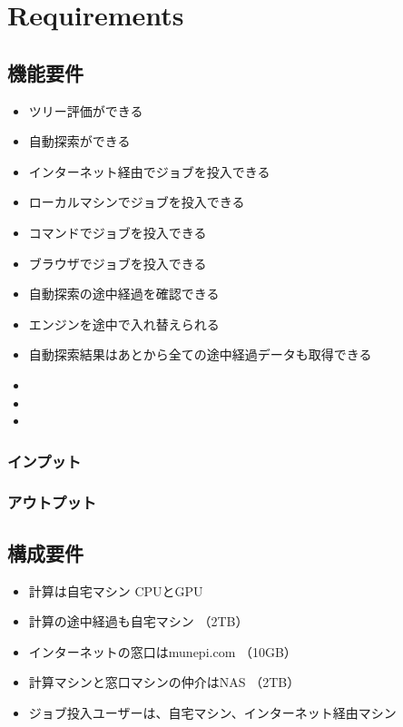 \documentclass{jsbook}
\begin{document}
\section{Requirements}

\subsection{機能要件}

\begin{itemize}
	\item ツリー評価ができる
	\item 自動探索ができる
	\item インターネット経由でジョブを投入できる
	\item ローカルマシンでジョブを投入できる
	\item コマンドでジョブを投入できる
	\item ブラウザでジョブを投入できる
	\item 自動探索の途中経過を確認できる
	\item エンジンを途中で入れ替えられる
	\item 自動探索結果はあとから全ての途中経過データも取得できる
	\item
	\item
	\item
\end{itemize}

\subsubsection{インプット}


\subsubsection{アウトプット}

\subsection{構成要件}

\begin{itemize}
	\item 計算は自宅マシン CPUとGPU
	\item 計算の途中経過も自宅マシン （2TB）
	\item インターネットの窓口はmunepi.com  （10GB）
	\item 計算マシンと窓口マシンの仲介はNAS  （2TB）
	\item ジョブ投入ユーザーは、自宅マシン、インターネット経由マシン
\end{itemize}
\end{document}
